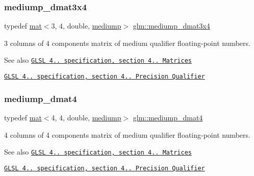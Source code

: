 \subsubsection{\texorpdfstring{mediump\+\_\+dmat3x4}{mediump\_dmat3x4}}
{\footnotesize\ttfamily typedef \hyperlink{structglm_1_1mat}{mat}$<$3, 4, double, \hyperlink{namespaceglm_a36ed105b07c7746804d7fdc7cc90ff25a6416f3ea0c9025fb21ed50c4d6620482}{mediump}$>$ \hyperlink{group__core__precision_ga8e38f500f63f5caed06699264acfb456}{glm\+::mediump\+\_\+dmat3x4}}

3 columns of 4 components matrix of medium qualifier floating-\/point numbers.

\begin{DoxySeeAlso}{See also}
\href{http://www.opengl.org/registry/doc/GLSLangSpec.4.20.8.pdf}{\tt G\+L\+SL 4.. specification, section 4.. Matrices} 

\href{http://www.opengl.org/registry/doc/GLSLangSpec.4.20.8.pdf}{\tt G\+L\+SL 4.. specification, section 4.. Precision Qualifier} 
\end{DoxySeeAlso}
\mbox{\label{group__core__precision_ga4b027f0f888d5ec1e77a00cb5517f56a}} 
\subsubsection{\texorpdfstring{mediump\+\_\+dmat4}{mediump\_dmat4}}
{\footnotesize\ttfamily typedef \hyperlink{structglm_1_1mat}{mat}$<$4, 4, double, \hyperlink{namespaceglm_a36ed105b07c7746804d7fdc7cc90ff25a6416f3ea0c9025fb21ed50c4d6620482}{mediump}$>$ \hyperlink{group__core__precision_ga4b027f0f888d5ec1e77a00cb5517f56a}{glm\+::mediump\+\_\+dmat4}}

4 columns of 4 components matrix of medium qualifier floating-\/point numbers.

\begin{DoxySeeAlso}{See also}
\href{http://www.opengl.org/registry/doc/GLSLangSpec.4.20.8.pdf}{\tt G\+L\+SL 4.. specification, section 4.. Matrices} 

\href{http://www.opengl.org/registry/doc/GLSLangSpec.4.20.8.pdf}{\tt G\+L\+SL 4.. specification, section 4.. Precision Qualifier} 
\end{DoxySeeAlso}
\mbox{\label{group__core__precision_ga0ef199d025bd14f9fc8f3ebd2b8daaa5}} 
